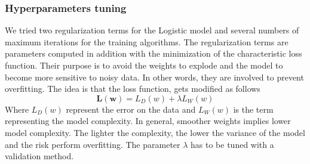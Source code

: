 \subsubsection{Hyperparameters tuning}
We tried two regularization terms for the Logistic model and several numbers of maximum iterations for the training algorithms.
The regularization terms are parameters computed in addition with the minimization of the characteristic loss function. Their purpose is to avoid the weights to explode and the model to become more sensitive to noisy data. In other words, they are involved to prevent overfitting.
The idea is that the loss function, gets modified as follows
\[ \mathbf{L(w)} = L_{D}(w) + \lambda L_{W}(w)\]
Where $ L_{D}(w)  $ represent the error on the data and $ L_{W}(w)  $ is the term representing the model complexity. In general, smoother weights implies lower model complexity. The lighter the complexity, the lower the variance of the model and the risk perform overfitting.
The parameter $ \mathit{\lambda} $ has to be tuned with a validation method.

